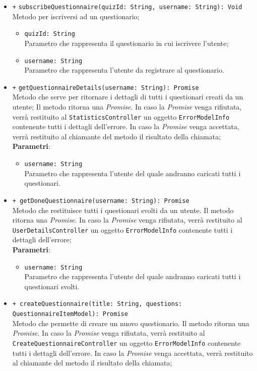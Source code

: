\begin{itemize}
\begin{itemize}
\begin{itemize}
	\end{itemize}
	\item \texttt{+} \texttt{subscribeQuestionnaire(quizId: String, username: String): Void} \\Metodo per iscriversi ad un questionario;
	\begin{itemize}
		\item \texttt{quizId: String} \\ Parametro che rappresenta il questionario in cui iscrivere l'utente;
		\item \texttt{username: String} \\ Parametro che rappresenta l'utente da registrare al questionario.
	\end{itemize}
	\item \texttt{+} \texttt{getQuestionnaireDetails(username: String): Promise} \\Metodo che serve per ritornare i dettagli di tutti i questionari creati da un utente; Il metodo ritorna una \textit{Promise}. In caso la \textit{Promise} venga rifiutata, verrà restituito al \texttt{StatisticsController} un oggetto \texttt{ErrorModelInfo} contenente tutti i dettagli dell'errore. In caso la \textit{Promise} venga accettata, verrà restituito al chiamante del metodo il risultato della chiamata;\\ 
     \textbf{Parametri}:
	\begin{itemize}
		\item \texttt{username: String} \\ Parametro che rappresenta l'utente del quale andranno caricati tutti i questionari.
	\end{itemize}
	\item \texttt{+ getDoneQuestionnaire(username: String): Promise} \\ Metodo che restituisce tutti i questionari svolti da un utente. Il metodo ritorna una \textit{Promise}. In caso la \textit{Promise} venga rifiutata, verrà restituito al \texttt{UserDetailsController} un oggetto \texttt{ErrorModelInfo} contenente tutti i dettagli dell'errore; \\
	\textbf{Parametri}: 
	\begin{itemize}
		\item \texttt{username: String} \\ Parametro che rappresenta l'utente del quale andranno caricati tutti i questionari svolti.
	\end{itemize}
	\item \texttt{+ createQuestionnaire(title: String, questions: QuestionnaireItemModel): Promise} \\ Metodo che permette di creare un nuovo questionario. Il metodo ritorna una \textit{Promise}. In caso la \textit{Promise} venga rifiutata, verrà restituito al \texttt{CreateQuestionnaireController} un oggetto \texttt{ErrorModelInfo} contenente tutti i dettagli dell'errore. In caso la \textit{Promise} venga accettata, verrà restituito al chiamante del metodo il risultato della chiamata;\\

\end{itemize}
\end{itemize}
